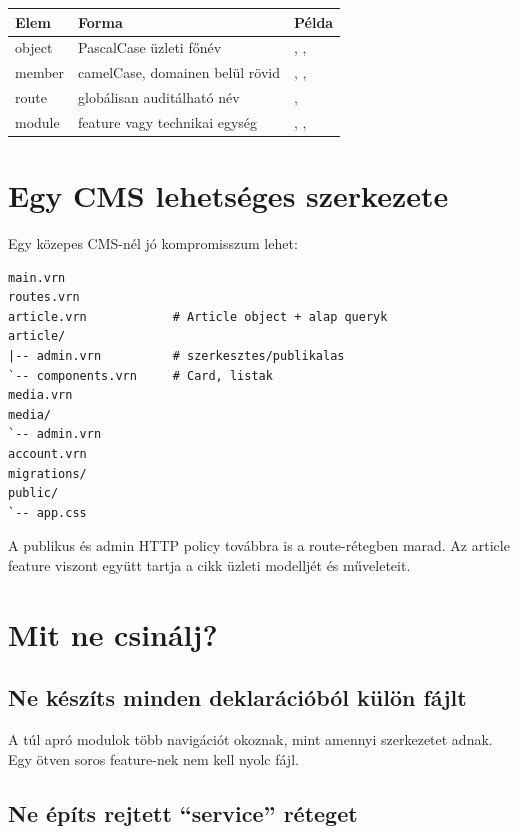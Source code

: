 \begin{center}
\begin{tabularx}{\textwidth}{@{}l l Y@{}}
\toprule
\textbf{Elem} & \textbf{Forma} & \textbf{Példa} \\
\midrule
object & PascalCase üzleti főnév & , ,  \\
member & camelCase, domainen belül rövid & , ,  \\
route & globálisan auditálható név & ,  \\
module & feature vagy technikai egység & , ,  \\
\bottomrule
\end{tabularx}
\end{center}

\section{Egy CMS lehetséges szerkezete}

Egy közepes CMS-nél jó kompromisszum lehet:

\begin{lstlisting}
main.vrn
routes.vrn
article.vrn            # Article object + alap queryk
article/
|-- admin.vrn          # szerkesztes/publikalas
`-- components.vrn     # Card, listak
media.vrn
media/
`-- admin.vrn
account.vrn
migrations/
public/
`-- app.css
\end{lstlisting}

A publikus és admin HTTP policy továbbra is a route-rétegben marad. Az article feature viszont együtt tartja a cikk üzleti modelljét és műveleteit.

\section{Mit ne csinálj?}

\subsection*{Ne készíts minden deklarációból külön fájlt}

A túl apró modulok több navigációt okoznak, mint amennyi szerkezetet adnak. Egy ötven soros feature-nek nem kell nyolc fájl.

\subsection*{Ne építs rejtett ``service'' réteget}

